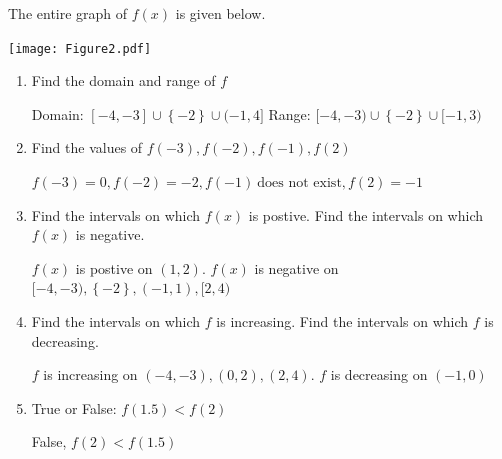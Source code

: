 \documentclass[nooutcomes]{ximera}
\begin{document}
\begin{problem}
The entire graph of $f(x)$ is given below.

	\begin{image}
	\texttt{[image: Figure2.pdf]}
	\end{image}

\begin{enumerate}	
	\item  Find the domain and range of $f$
		\begin{freeResponse}
			Domain: $[-4,-3]\cup\left\{-2\right\}\cup(-1,4]$
			Range: $[-4,-3)\cup\left\{-2\right\}\cup[-1,3)$
		\end{freeResponse}	

	\item  Find the values of $f(-3),f(-2), f(-1),f(2)$
		\begin{freeResponse}
		$f(-3)=0, f(-2)=-2, f(-1)\ \text{does not exist}, f(2)=-1$
		\end{freeResponse}	

	\item  Find the intervals on which $f(x)$ is postive.  Find the intervals on which $f(x)$ is negative.
		\begin{freeResponse}
		 $f(x)$ is postive on $(1,2)$. $f(x)$ is negative on $[-4,-3),\left\{-2\right\},(-1,1),[2,4)$
		\end{freeResponse}
	
	\item Find the intervals on which $f$ is increasing.  Find the intervals on which $f$ is decreasing.
		\begin{freeResponse}
		$f$ is increasing on $(-4,-3),(0,2),(2,4)$.  $f$ is decreasing on $(-1,0)$
		\end{freeResponse}
	
	\item True or False: $f(1.5) < f(2)$
		\begin{freeResponse}
		False, $f(2) < f(1.5)$
		\end{freeResponse}	
	
	\end{enumerate}

	
\end{problem}
\end{document}

